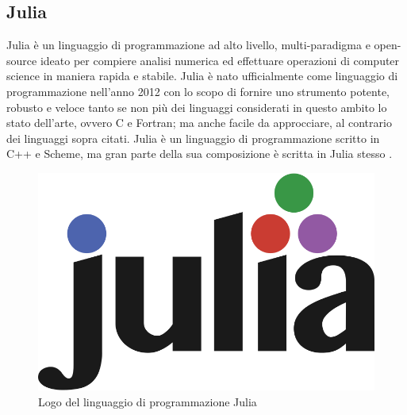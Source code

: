 \subsection{Julia}
Julia è un linguaggio di programmazione ad alto livello, 
multi-paradigma e open-source ideato per compiere analisi 
numerica ed effettuare operazioni di computer science in 
maniera rapida e stabile. Julia è nato ufficialmente come 
linguaggio di programmazione nell’anno 2012 con lo scopo di 
fornire uno strumento potente, robusto e veloce tanto se non 
più dei linguaggi considerati in questo ambito lo stato 
dell’arte, ovvero C e Fortran;  ma anche facile da approcciare, 
al contrario dei linguaggi sopra citati. Julia è un linguaggio 
di programmazione scritto in C++ e Scheme, ma gran parte della 
sua composizione è scritta in Julia stesso 
\cite{wiki:Julia_(programming_language)}.

\begin{figure}
    \includegraphics[width=\linewidth]{img/Julia_Programming_Language_Logo.svg.png}
    \caption{Logo del linguaggio di programmazione Julia}
    \label{fig:Julia_logo}
\end{figure}

